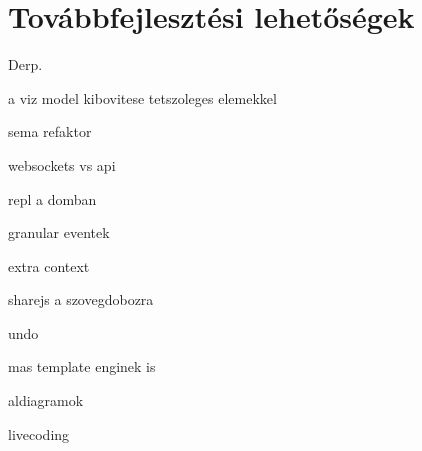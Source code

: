
\section{Továbbfejlesztési lehetőségek}
Derp.

a viz model kibovitese tetszoleges elemekkel

sema refaktor

websockets vs api

repl a domban

granular eventek

extra context

sharejs a szovegdobozra

undo

mas template enginek is


aldiagramok

livecoding 